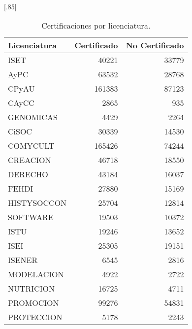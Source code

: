 \documentclass[12pt]{article}
\begin{document}
\begin{table}[ht]
\centering
\scalebox{0.75}[.85]{
\begin{tabular}{lrr}
  \hline
 Licenciatura & Certificado & No Certificado \\ 
  \hline
ISET & 40221 & 33779 \\ 
  AyPC & 63532 & 28768 \\ 
  CPyAU & 161383 & 87123 \\ 
  CAyCC & 2865 & 935 \\ 
  GENOMICAS & 4429 & 2264 \\ 
  CiSOC & 30339 & 14530 \\ 
  COMYCULT & 165426 & 74244 \\ 
  CREACION & 46718 & 18550 \\ 
  DERECHO & 43184 & 16037 \\ 
  FEHDI & 27880 & 15169 \\ 
  HISTYSOCCON & 25704 & 12814 \\ 
  SOFTWARE & 19503 & 10372 \\ 
  ISTU & 19246 & 13652 \\ 
  ISEI & 25305 & 19151 \\ 
  ISENER & 6545 & 2816 \\ 
  MODELACION & 4922 & 2722 \\ 
  NUTRICION & 16725 & 4711 \\ 
  PROMOCION & 99276 & 54831 \\ 
  PROTECCION & 5178 & 2243 \\ 
   \hline
\end{tabular}
}
\caption{\label{Cert_Lic_Cal}Certificaciones por licenciatura.}
\end{table}
\end{document}
